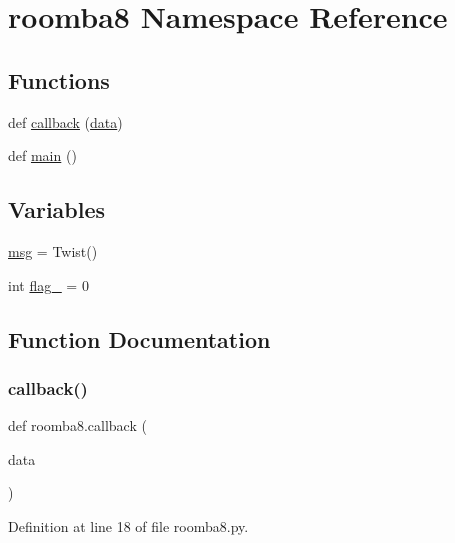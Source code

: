 \hypertarget{namespaceroomba8}{}\section{roomba8 Namespace Reference}
\label{namespaceroomba8}
\subsection*{Functions}
\begin{DoxyCompactItemize}
\item 
def \mbox{\hyperlink{namespaceroomba8_aeb650d9248f8e08d76c28c0ac2a1cc40}{callback}} (\mbox{\hyperlink{structdata}{data}})
\item 
def \mbox{\hyperlink{namespaceroomba8_a5022740f37307eaee051293c95619a30}{main}} ()
\end{DoxyCompactItemize}
\subsection*{Variables}
\begin{DoxyCompactItemize}
\item 
\mbox{\hyperlink{namespaceroomba8_acbe808bc3ef9fe68480769672ce1ae43}{msg}} = Twist()
\item 
int \mbox{\hyperlink{namespaceroomba8_a2dcb71a7f454c6b24fbde3fa564751c8}{flag\+\_}} = 0
\end{DoxyCompactItemize}


\subsection{Function Documentation}
\mbox{\label{namespaceroomba8_aeb650d9248f8e08d76c28c0ac2a1cc40}} 
\subsubsection{\texorpdfstring{callback()}{callback()}}
{\footnotesize\ttfamily def roomba8.\+callback (\begin{DoxyParamCaption}\item[{}]{data }\end{DoxyParamCaption})}



Definition at line 18 of file roomba8.\+py.

\mbox{\label{namespaceroomba8_a5022740f37307eaee051293c95619a30}} 
